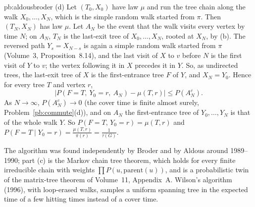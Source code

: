 \begin{solution}{pb:aldousbroder}
(d) Let $(T_0,X_0)$ have law $\mu$ and run the tree chain along the walk $X_0,\dots,X_N$, which is the simple random walk started from $\pi$. Then $(T_N,X_N)$ has
law $\mu$. Let $A_N$ be the event that the walk visits every vertex by time $N$; on $A_N$, $T_N$ is the last-exit tree of $X_0,\dots,X_N$, rooted at $X_N$, by (b).
The reversed path $Y_s=X_{N-s}$ is again a simple random walk started from $\pi$ (Volume~3, Proposition~8.14), and the last visit of $X$ to $v$ before $N$
is the first visit of $Y$ to $v$; the vertex following it in $X$ precedes it in $Y$. So, as undirected trees, the last-exit tree of $X$ is the
first-entrance tree $F$ of $Y$, and $X_N=Y_0$. Hence for every tree $T$ and vertex $r$,
\[
\bigl|P(F=T,\ Y_0=r,\ A_N)-\mu(T,r)\bigr|\le P(A_N^c).
\]
As $N\to\infty$, $P(A_N^c)\to0$ (the cover time is finite almost surely, Problem~\ref{pb:commute}(d)), and on $A_N$ the first-entrance tree of $Y_0,\dots,Y_N$ is that of the
whole walk $Y$. So $P(F=T,\,Y_0=r)=\mu(T,r)$ and $P(F=T\mid Y_0=r)=\frac{\mu(T,r)}{\pi(r)}=\frac1{\tau(G)}$.

\leads The algorithm was found independently by Broder and by Aldous around 1989--1990; part (c) is the Markov chain tree theorem, which
holds for every finite irreducible chain with weights $\prod P(u,\text{parent}(u))$, and is a probabilistic twin of the matrix-tree theorem of Volume~11, Appendix~A.
Wilson's algorithm (1996), with loop-erased walks, samples a uniform spanning tree in the expected time of a few hitting times instead of
a cover time.
\end{solution}


